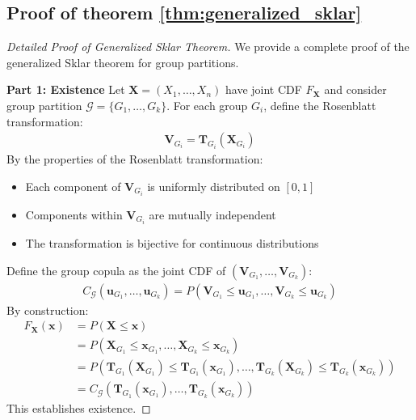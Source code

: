 \subsection{Proof of theorem \ref{thm:generalized_sklar}}
\begin{proof}[Detailed Proof of Generalized Sklar Theorem]
We provide a complete proof of the generalized Sklar theorem for group partitions.

\textbf{Part 1: Existence}
Let $\mathbf{X} = (X_1, \ldots, X_n)$ have joint CDF $F_{\mathbf{X}}$ and consider group partition $\mathcal{G} = \{G_1, \ldots, G_k\}$.
For each group $G_i$, define the Rosenblatt transformation:
\begin{align}
\mathbf{V}_{G_i} = \mathbf{T}_{G_i}(\mathbf{X}_{G_i})
\end{align}
By the properties of the Rosenblatt transformation:
\begin{itemize}
    \item Each component of $\mathbf{V}_{G_i}$ is uniformly distributed on $[0,1]$
    \item Components within $\mathbf{V}_{G_i}$ are mutually independent
    \item The transformation is bijective for continuous distributions
\end{itemize}
Define the group copula as the joint CDF of $(\mathbf{V}_{G_1}, \ldots, \mathbf{V}_{G_k})$:
\begin{align}
C_{\mathcal{G}}(\mathbf{u}_{G_1}, \ldots, \mathbf{u}_{G_k}) = P(\mathbf{V}_{G_1} \leq \mathbf{u}_{G_1}, \ldots, \mathbf{V}_{G_k} \leq \mathbf{u}_{G_k})
\end{align}
By construction:
\begin{align}
F_{\mathbf{X}}(\mathbf{x}) &= P(\mathbf{X} \leq \mathbf{x}) \\
&= P(\mathbf{X}_{G_1} \leq \mathbf{x}_{G_1}, \ldots, \mathbf{X}_{G_k} \leq \mathbf{x}_{G_k}) \\
&= P(\mathbf{T}_{G_1}(\mathbf{X}_{G_1}) \leq \mathbf{T}_{G_1}(\mathbf{x}_{G_1}), \ldots, \mathbf{T}_{G_k}(\mathbf{X}_{G_k}) \leq \mathbf{T}_{G_k}(\mathbf{x}_{G_k})) \\
&= C_{\mathcal{G}}(\mathbf{T}_{G_1}(\mathbf{x}_{G_1}), \ldots, \mathbf{T}_{G_k}(\mathbf{x}_{G_k}))
\end{align}
This establishes existence.


\end{proof}
